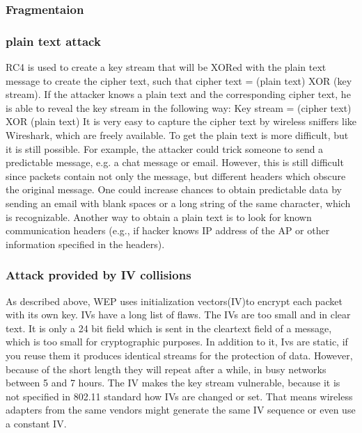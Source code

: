 \documentclass[a4paper,12pt,pagesize,headsepline,bibtotoc,titlepage]{scrartcl}
\begin{document}
\subsubsection{Fragmentaion }

\subsubsection{plain text attack}

RC4 is used to create a key stream that will be XORed with the plain text message to create the cipher text, such that
cipher text = (plain text) XOR (key stream).
If the attacker knows a plain text and the corresponding cipher text, he is able to reveal the key stream in the following way: 
 Key stream = (cipher text) XOR (plain text)
It is very easy to capture the cipher text by wireless sniffers like Wireshark, which are freely available.
To get the plain text is more difficult, but it is still possible. For example, the attacker could trick someone to send a predictable message, e.g. a chat message or email.
However, this is still difficult since packets contain not only the message, but different headers which obscure the original message.
One could increase chances to obtain predictable data by sending an
email with blank spaces or a long string of the same character, which is recognizable. 
Another way to obtain a plain text is to look for known
communication headers (e.g., if hacker knows IP address of the
AP or other information specified in the headers).

\subsubsection{Attack provided by IV collisions}

As described above,  WEP uses initialization vectors(IV)to encrypt each packet
with its own key.
IVs have a long list of flaws.
The IVs are too small and in clear text. 
It is only a 24 bit field which is sent in the cleartext field of a message, which is too small for cryptographic purposes. 
In addition to it, Ivs are static, if you reuse them it produces identical streams for  the protection of data. However, because of the short length they will repeat after a while, in busy networks between 5 and 7 hours.
The IV makes the key stream vulnerable, because it is not specified in 802.11 standard how IVs are changed or set. That means wireless adapters from the same vendors might generate the same IV sequence or even use a constant IV.
\end{document}
